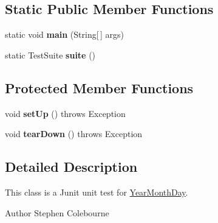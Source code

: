 \subsection*{Static Public Member Functions}
\begin{DoxyCompactItemize}
\item 
\hypertarget{classorg_1_1joda_1_1time_1_1_test_year_month_day___constructors_adb9e4fda74981acd22f5afd410231dbd}{static void {\bfseries main} (String\mbox{[}$\,$\mbox{]} args)}\label{classorg_1_1joda_1_1time_1_1_test_year_month_day___constructors_adb9e4fda74981acd22f5afd410231dbd}

\item 
\hypertarget{classorg_1_1joda_1_1time_1_1_test_year_month_day___constructors_a882cad7ce16c561e200d6b84250ed5ff}{static Test\-Suite {\bfseries suite} ()}\label{classorg_1_1joda_1_1time_1_1_test_year_month_day___constructors_a882cad7ce16c561e200d6b84250ed5ff}

\end{DoxyCompactItemize}
\subsection*{Protected Member Functions}
\begin{DoxyCompactItemize}
\item 
\hypertarget{classorg_1_1joda_1_1time_1_1_test_year_month_day___constructors_aa9c4b7189a2096fc08dc0218fb97dd51}{void {\bfseries set\-Up} ()  throws Exception }\label{classorg_1_1joda_1_1time_1_1_test_year_month_day___constructors_aa9c4b7189a2096fc08dc0218fb97dd51}

\item 
\hypertarget{classorg_1_1joda_1_1time_1_1_test_year_month_day___constructors_a6c6fca1e61dc7d170ed16bf79492c45f}{void {\bfseries tear\-Down} ()  throws Exception }\label{classorg_1_1joda_1_1time_1_1_test_year_month_day___constructors_a6c6fca1e61dc7d170ed16bf79492c45f}

\end{DoxyCompactItemize}


\subsection{Detailed Description}
This class is a Junit unit test for \hyperlink{classorg_1_1joda_1_1time_1_1_year_month_day}{Year\-Month\-Day}.

\begin{DoxyAuthor}{Author}
Stephen Colebourne 
\end{DoxyAuthor}


